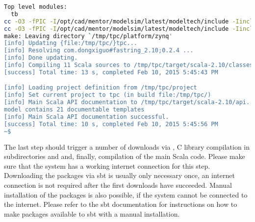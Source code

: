 \begin{enumerate}
\begin{lstlisting}[language=bash]
Top level modules:
  tb
cc -O3 -fPIC -I/opt/cad/mentor/modelsim/latest/modeltech/include -Iinclude -I../common/include -std=gnu99 -pedantic-errors -Wall -Werror  -shared -pthread -o lib/libplatform-server.so src/platform_server.c
cc -O3 -fPIC -I/opt/cad/mentor/modelsim/latest/modeltech/include -Iinclude -I../common/include -std=gnu99 -pedantic-errors -Wall -Werror  -shared -pthread -o lib/libplatform-client.so src/platform_client.c
make: Leaving directory `/tmp/tpc/platform/zynq'
[info] Updating {file:/tmp/tpc/}tpc...
[info] Resolving com.dongxiguo#fastring_2.10;0.2.4 ...
[info] Done updating.
[info] Compiling 11 Scala sources to /tmp/tpc/target/scala-2.10/classes...
[success] Total time: 13 s, completed Feb 10, 2015 5:45:43 PM

[info] Loading project definition from /tmp/tpc/project
[info] Set current project to tpc (in build file:/tmp/tpc/)
[info] Main Scala API documentation to /tmp/tpc/target/scala-2.10/api...
model contains 21 documentable templates
[info] Main Scala API documentation successful.
[success] Total time: 10 s, completed Feb 10, 2015 5:45:56 PM
~$ 
        \end{lstlisting}
\end{enumerate}
The last step should trigger a number of downloads via , C library compilation in subdirectories  and  and, finally, compilation of the main Scala code.
Please make sure that the system has a working internet connection for this step.
Downloading the packages via sbt is usually only necessary once, an internet connection is not required after the first downloads have succeeded.
Manual installation of the packages is also possible, if the system cannot be connected to the internet.
Please refer to the sbt documentation for instructions on how to make packages available to sbt with a manual installation.

